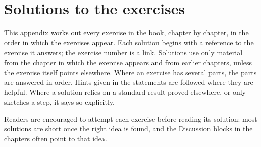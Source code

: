 \chapter{Solutions to the exercises}\label{ch:solutions}
\renewcommand{\sectionmark}[1]{\markright{\thesection\quad SOLUTIONS}}

This appendix works out every exercise in the book, chapter by chapter, in the
order in which the exercises appear. Each solution begins with a reference to the
exercise it answers; the exercise number is a link. Solutions use only material
from the chapter in which the exercise appears and from earlier chapters, unless
the exercise itself points elsewhere. Where an exercise has several parts, the
parts are answered in order. Hints given in the statements are followed where
they are helpful. Where a solution relies on a standard result proved
elsewhere, or only sketches a step, it says so explicitly.

Readers are encouraged to attempt each exercise before reading its solution:
most solutions are short once the right idea is found, and the Discussion blocks in
the chapters often point to that idea.
